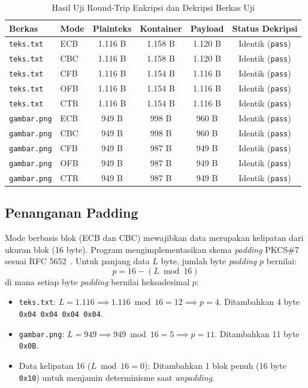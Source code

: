 \begin{table}[H]
  \centering
  \caption{Hasil Uji Round-Trip Enkripsi dan Dekripsi Berkas Uji}\label{tab:roundtrip_results}
  \begin{tabular}{llcccc}
    \toprule
    Berkas & Mode & Plainteks & Kontainer & Payload & Status Dekripsi \\
    \midrule
    \texttt{teks.txt}   & ECB & 1.116 B & 1.158 B & 1.120 B & Identik (\texttt{pass}) \\
    \texttt{teks.txt}   & CBC & 1.116 B & 1.158 B & 1.120 B & Identik (\texttt{pass}) \\
    \texttt{teks.txt}   & CFB & 1.116 B & 1.154 B & 1.116 B & Identik (\texttt{pass}) \\
    \texttt{teks.txt}   & OFB & 1.116 B & 1.154 B & 1.116 B & Identik (\texttt{pass}) \\
    \texttt{teks.txt}   & CTR & 1.116 B & 1.154 B & 1.116 B & Identik (\texttt{pass}) \\
    \midrule
    \texttt{gambar.png} & ECB & 949 B   & 998 B   & 960 B   & Identik (\texttt{pass}) \\
    \texttt{gambar.png} & CBC & 949 B   & 998 B   & 960 B   & Identik (\texttt{pass}) \\
    \texttt{gambar.png} & CFB & 949 B   & 987 B   & 949 B   & Identik (\texttt{pass}) \\
    \texttt{gambar.png} & OFB & 949 B   & 987 B   & 949 B   & Identik (\texttt{pass}) \\
    \texttt{gambar.png} & CTR & 949 B   & 987 B   & 949 B   & Identik (\texttt{pass}) \\
    \bottomrule
  \end{tabular}
\end{table}

\subsection{Penanganan Padding}
Mode berbasis blok (ECB dan CBC) mewajibkan data merupakan kelipatan dari ukuran blok (16 byte). Program mengimplementasikan skema \textit{padding} PKCS\#7 sesuai RFC 5652~\cite{rfc5652}. Untuk panjang data $L$ byte, jumlah byte \textit{padding} $p$ bernilai:
\begin{equation}
  p = 16 - (L \bmod 16)
\end{equation}
di mana setiap byte \textit{padding} bernilai heksadesimal $p$:
\begin{itemize}
  \item \texttt{teks.txt}: $L = 1.116 \implies 1.116 \bmod 16 = 12 \implies p = 4$. Ditambahkan 4 byte \texttt{0x04 0x04 0x04 0x04}.
  \item \texttt{gambar.png}: $L = 949 \implies 949 \bmod 16 = 5 \implies p = 11$. Ditambahkan 11 byte \texttt{0x0B}.
  \item Data kelipatan 16 ($L \bmod 16 = 0$): Ditambahkan 1 blok penuh (16 byte \texttt{0x10}) untuk menjamin determinisme saat \textit{unpadding}.
\end{itemize}

